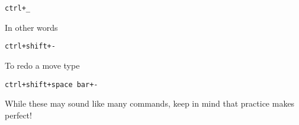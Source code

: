 \documentclass[aps,showpacs,prd,notitlepage,preprintnumbers,amsmath,amssymb,letterpaper]{revtex4}
\begin{document}
\begin{itemize}
\begin{verbatim}
ctrl+_
\end{verbatim}

In other words

\begin{verbatim}
ctrl+shift+-
\end{verbatim}

To redo a move type

\begin{verbatim}
ctrl+shift+space bar+-
\end{verbatim}

While these may sound like many commands, keep in mind that practice makes perfect!
\end{itemize}




%
%
%
%
%
%
%
%
\end{document}
